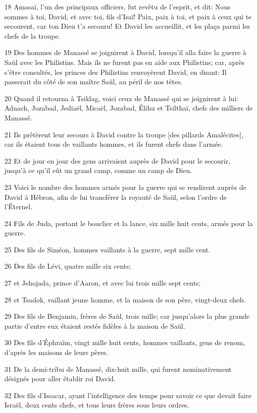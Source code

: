 \par 18 Amasaï, l'un des principaux officiers, fut revêtu de l'esprit, et dit: Nous sommes à toi, David, et avec toi, fils d'Isaï! Paix, paix à toi, et paix à ceux qui te secourent, car ton Dieu t'a secouru! Et David les accueillit, et les plaça parmi les chefs de la troupe.
\par 19 Des hommes de Manassé se joignirent à David, lorsqu'il alla faire la guerre à Saül avec les Philistins. Mais ils ne furent pas en aide aux Philistins; car, après s'être consultés, les princes des Philistins renvoyèrent David, en disant: Il passerait du côté de son maître Saül, au péril de nos têtes.
\par 20 Quand il retourna à Tsiklag, voici ceux de Manassé qui se joignirent à lui: Adnach, Jozabad, Jediaël, Micaël, Jozabad, Élihu et Tsilthaï, chefs des milliers de Manassé.
\par 21 Ils prêtèrent leur secours à David contre la troupe [des pillards Amalécites], car ils étaient tous de vaillants hommes, et ils furent chefs dans l'armée.
\par 22 Et de jour en jour des gens arrivaient auprès de David pour le secourir, jusqu'à ce qu'il eût un grand camp, comme un camp de Dieu.
\par 23 Voici le nombre des hommes armés pour la guerre qui se rendirent auprès de David à Hébron, afin de lui transférer la royauté de Saül, selon l'ordre de l'Éternel.
\par 24 Fils de Juda, portant le bouclier et la lance, six mille huit cents, armés pour la guerre.
\par 25 Des fils de Siméon, hommes vaillants à la guerre, sept mille cent.
\par 26 Des fils de Lévi, quatre mille six cents;
\par 27 et Jehojada, prince d'Aaron, et avec lui trois mille sept cents;
\par 28 et Tsadok, vaillant jeune homme, et la maison de son père, vingt-deux chefs.
\par 29 Des fils de Benjamin, frères de Saül, trois mille; car jusqu'alors la plus grande partie d'entre eux étaient restés fidèles à la maison de Saül.
\par 30 Des fils d'Éphraïm, vingt mille huit cents, hommes vaillants, gens de renom, d'après les maisons de leurs pères.
\par 31 De la demi-tribu de Manassé, dix-huit mille, qui furent nominativement désignés pour aller établir roi David.
\par 32 Des fils d'Issacar, ayant l'intelligence des temps pour savoir ce que devait faire Israël, deux cents chefs, et tous leurs frères sous leurs ordres.
